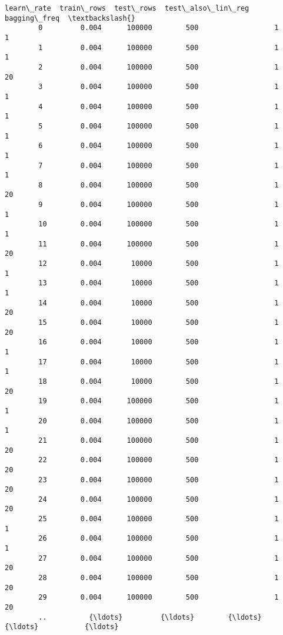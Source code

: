 \documentclass[11pt]{article}
\begin{document}
\begin{Verbatim}[commandchars=\\\{\}]
             learn\_rate  train\_rows  test\_rows  test\_also\_lin\_reg  bagging\_freq  \textbackslash{}
        0         0.004      100000        500                  1             1   
        1         0.004      100000        500                  1             1   
        2         0.004      100000        500                  1            20   
        3         0.004      100000        500                  1             1   
        4         0.004      100000        500                  1             1   
        5         0.004      100000        500                  1             1   
        6         0.004      100000        500                  1             1   
        7         0.004      100000        500                  1             1   
        8         0.004      100000        500                  1            20   
        9         0.004      100000        500                  1             1   
        10        0.004      100000        500                  1             1   
        11        0.004      100000        500                  1            20   
        12        0.004       10000        500                  1             1   
        13        0.004       10000        500                  1             1   
        14        0.004       10000        500                  1            20   
        15        0.004       10000        500                  1            20   
        16        0.004       10000        500                  1             1   
        17        0.004       10000        500                  1             1   
        18        0.004       10000        500                  1            20   
        19        0.004      100000        500                  1             1   
        20        0.004      100000        500                  1             1   
        21        0.004      100000        500                  1            20   
        22        0.004      100000        500                  1            20   
        23        0.004      100000        500                  1            20   
        24        0.004      100000        500                  1            20   
        25        0.004      100000        500                  1             1   
        26        0.004      100000        500                  1             1   
        27        0.004      100000        500                  1            20   
        28        0.004      100000        500                  1            20   
        29        0.004      100000        500                  1            20   
        ..          {\ldots}         {\ldots}        {\ldots}                {\ldots}           {\ldots}   

\end{Verbatim}
\end{document}
